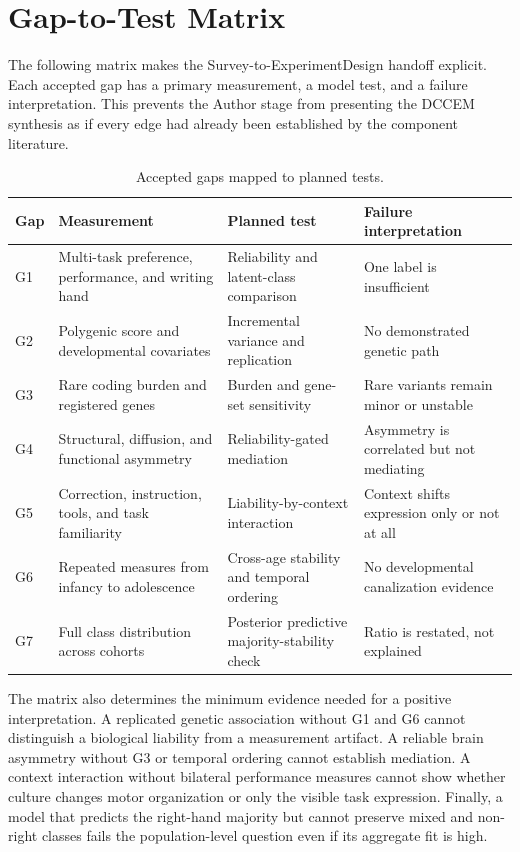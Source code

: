 \documentclass[10pt,conference]{IEEEtran}
\begin{document}
\section{Gap-to-Test Matrix}
The following matrix makes the Survey-to-ExperimentDesign handoff explicit. Each accepted gap has a primary measurement, a model test, and a failure interpretation. This prevents the Author stage from presenting the DCCEM synthesis as if every edge had already been established by the component literature.

\begin{table}[h]
\caption{Accepted gaps mapped to planned tests.}
\centering
\scriptsize
\begin{tabularx}{\columnwidth}{@{}p{}p{}YY@{}}
\toprule
Gap & Measurement & Planned test & Failure interpretation \\
\midrule
G1 & Multi-task preference, performance, and writing hand & Reliability and latent-class comparison & One label is insufficient \\
G2 & Polygenic score and developmental covariates & Incremental variance and replication & No demonstrated genetic path \\
G3 & Rare coding burden and registered genes & Burden and gene-set sensitivity & Rare variants remain minor or unstable \\
G4 & Structural, diffusion, and functional asymmetry & Reliability-gated mediation & Asymmetry is correlated but not mediating \\
G5 & Correction, instruction, tools, and task familiarity & Liability-by-context interaction & Context shifts expression only or not at all \\
G6 & Repeated measures from infancy to adolescence & Cross-age stability and temporal ordering & No developmental canalization evidence \\
G7 & Full class distribution across cohorts & Posterior predictive majority-stability check & Ratio is restated, not explained \\
\bottomrule
\end{tabularx}
\end{table}

The matrix also determines the minimum evidence needed for a positive interpretation. A replicated genetic association without G1 and G6 cannot distinguish a biological liability from a measurement artifact. A reliable brain asymmetry without G3 or temporal ordering cannot establish mediation. A context interaction without bilateral performance measures cannot show whether culture changes motor organization or only the visible task expression. Finally, a model that predicts the right-hand majority but cannot preserve mixed and non-right classes fails the population-level question even if its aggregate fit is high.
\end{document}
